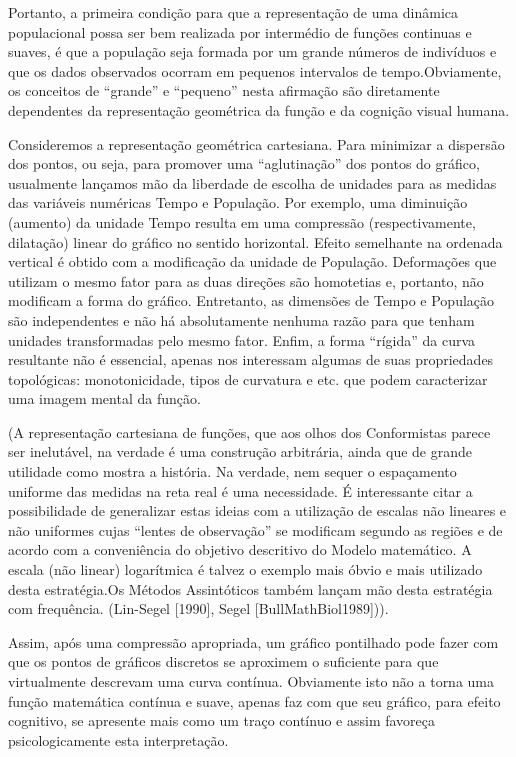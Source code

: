    Portanto, a primeira condição para que a representação de uma dinâmica populacional possa ser bem realizada por intermédio de funções continuas e suaves, é que a população seja formada por um grande números de indivíduos e que os dados observados ocorram em pequenos intervalos de tempo.Obviamente, os conceitos de ``grande'' e ``pequeno'' nesta afirmação são diretamente dependentes da representação geométrica da função e da cognição visual humana.

    Consideremos a representação geométrica cartesiana. Para minimizar a dispersão dos pontos, ou seja, para promover uma ``aglutinação'' dos pontos do gráfico, usualmente lançamos mão da liberdade de escolha de unidades para as medidas das variáveis numéricas Tempo e População. Por exemplo, uma diminuição (aumento) da unidade Tempo resulta em uma compressão (respectivamente, dilatação) linear do gráfico no sentido horizontal. Efeito semelhante na ordenada vertical é obtido com a modificação da unidade de População. Deformações que utilizam o mesmo fator para as duas direções são homotetias e, portanto, não modificam a forma do gráfico. Entretanto, as dimensões de Tempo e População são independentes e não há absolutamente nenhuma razão para que tenham unidades transformadas pelo mesmo fator. Enfim, a forma ``rígida'' da curva resultante não é essencial, apenas nos interessam algumas de suas propriedades topológicas: monotonicidade, tipos de curvatura e etc. que podem caracterizar uma imagem mental da função.

    (A representação cartesiana de funções, que aos olhos dos Conformistas parece ser inelutável, na verdade é uma construção arbitrária, ainda que de grande utilidade como mostra a história. Na verdade, nem sequer o espaçamento uniforme das medidas na reta real é uma necessidade. É interessante citar a possibilidade de generalizar estas ideias com a utilização de escalas não lineares e não uniformes cujas ``lentes de observação'' se modificam segundo as regiões e de acordo com a conveniência do objetivo descritivo do Modelo matemático. A escala (não linear) logarítmica é talvez o exemplo mais óbvio e mais utilizado desta estratégia.Os Métodos Assintóticos também lançam mão desta estratégia com frequência. (Lin-Segel [1990], Segel [BullMathBiol1989])).

    Assim, após uma compressão apropriada, um gráfico pontilhado pode fazer com que os pontos de gráficos discretos se aproximem o suficiente para que virtualmente descrevam uma curva contínua. Obviamente isto não a torna uma função matemática contínua e suave, apenas faz com que seu gráfico, para efeito cognitivo, se apresente mais como um traço contínuo e assim favoreça psicologicamente esta interpretação.

